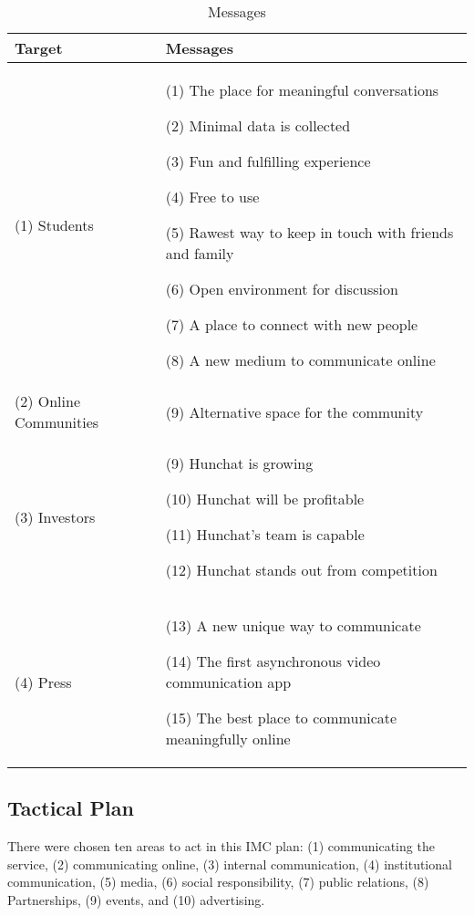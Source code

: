 \documentclass[12pt]{article}
\begin{document}
\begin{table}[htb]
\small
\caption{Messages}
\label{table:msg}
\centering
\begin{tabular}{ @{}P{0.28\textwidth}P{0.62\textwidth}@{} }
Target	&	Messages	\\ \hline
(1) Students \par 	&	(1) The place for meaningful conversations \par (2) Minimal data is collected \par (3) Fun and fulfilling experience \par  (4) Free to use \par (5) Rawest way to keep in touch with friends and family \par (6) Open environment for discussion  \par  (7) A place to connect with new people \par (8) A new medium to communicate online \\
(2) Online Communities & (9) Alternative space for the community \\
(3) Investors	&	(9) Hunchat is growing \par (10) Hunchat will be profitable \par (11) Hunchat's team is capable  \par (12) Hunchat stands out from competition \\
(4) Press	& 	(13) A new unique way to communicate \par (14) The first asynchronous video communication app \par (15) The best place to communicate meaningfully online \\
 \hline
\end{tabular}
\end{table}



\subsection{Tactical Plan}
	There were chosen ten areas to act in this IMC plan: (1) communicating the service, (2) communicating online, (3) internal communication, (4) institutional communication, (5) media, (6) social responsibility, (7) public relations, (8) Partnerships, (9) events, and (10) advertising.
\end{document}
